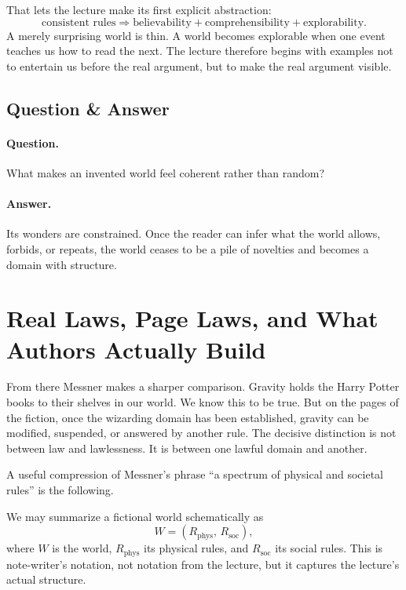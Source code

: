 That lets the lecture make its first explicit abstraction:
\begin{equation}
\text{consistent rules} \Rightarrow \text{believability} + \text{comprehensibility} + \text{explorability}.
\end{equation}
A merely surprising world is thin. A world becomes explorable when one event teaches us how to read the next. The lecture therefore begins with examples not to entertain us before the real argument, but to make the real argument visible.

\subsection{Question \& Answer}

\paragraph{Question.} What makes an invented world feel coherent rather than random?

\paragraph{Answer.} Its wonders are constrained. Once the reader can infer what the world allows, forbids, or repeats, the world ceases to be a pile of novelties and becomes a domain with structure.

\section{Real Laws, Page Laws, and What Authors Actually Build}

From there Messner makes a sharper comparison. Gravity holds the Harry Potter books to their shelves in our world. We know this to be true. But on the pages of the fiction, once the wizarding domain has been established, gravity can be modified, suspended, or answered by another rule. The decisive distinction is not between law and lawlessness. It is between one lawful domain and another.

A useful compression of Messner's phrase ``a spectrum of physical and societal rules'' is the following.

\begin{definition}
We may summarize a fictional world schematically as
\begin{equation}
W = (R_{\mathrm{phys}},\,R_{\mathrm{soc}}),
\end{equation}
where \(W\) is the world, \(R_{\mathrm{phys}}\) its physical rules, and \(R_{\mathrm{soc}}\) its social rules. This is note-writer's notation, not notation from the lecture, but it captures the lecture's actual structure.
\end{definition}

